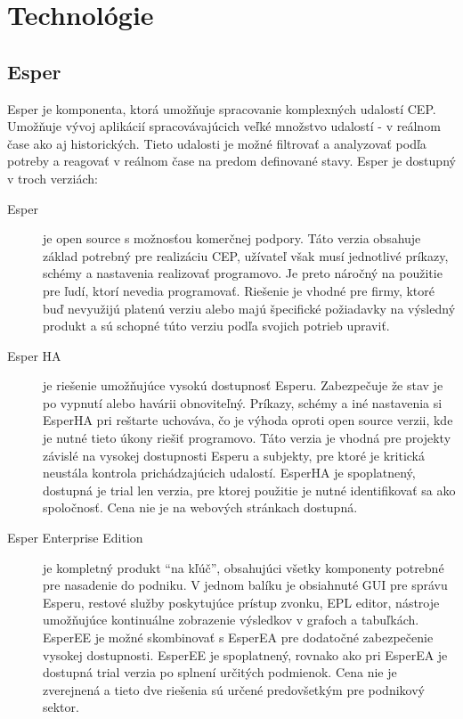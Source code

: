 \chapter{Technológie}
\label{chap:technologie}

\section{Esper}
	Esper je komponenta, ktorá umožňuje spracovanie komplexných udalostí \ac{CEP}. Umožňuje vývoj aplikácií spracovávajúcich veľké množstvo udalostí - v reálnom čase ako aj historických. Tieto udalosti je možné filtrovať a analyzovať podľa potreby a reagovať v reálnom čase na predom definované stavy.  Esper je dostupný v troch verziách:
	\begin{description}
		\item[Esper] je open source s možnosťou komerčnej podpory. Táto verzia obsahuje základ potrebný pre realizáciu CEP, užívateľ však musí jednotlivé príkazy, schémy a nastavenia realizovať programovo. Je preto náročný na použitie pre ľudí, ktorí nevedia programovať. Riešenie je vhodné pre firmy, ktoré buď nevyužijú platenú verziu alebo majú špecifické požiadavky na výsledný produkt a sú schopné túto verziu podľa svojich potrieb upraviť.
		
		\item[Esper HA] je riešenie umožňujúce vysokú dostupnosť Esperu. Zabezpečuje že stav je po vypnutí alebo havárii obnoviteľný. Príkazy, schémy a iné nastavenia si EsperHA pri reštarte uchováva, čo je výhoda oproti open source verzii, kde je nutné tieto úkony riešiť programovo. Táto verzia je vhodná pre projekty závislé na vysokej dostupnosti Esperu a subjekty, pre ktoré je kritická neustála kontrola prichádzajúcich udalostí.
		EsperHA je spoplatnený, dostupná je trial len verzia, pre ktorej použitie je nutné identifikovať sa ako spoločnosť. Cena nie je na webových stránkach dostupná.
		
		\item[Esper Enterprise Edition] je kompletný produkt ``na kľúč'', obsahujúci všetky komponenty potrebné pre nasadenie do podniku. V jednom balíku je obsiahnuté GUI pre správu Esperu, restové služby poskytujúce prístup zvonku, \ac{EPL} editor, nástroje umožňujúce kontinuálne zobrazenie výsledkov v grafoch a tabuľkách. EsperEE je možné skombinovať s EsperEA pre dodatočné zabezpečenie vysokej dostupnosti. EsperEE je spoplatnený, rovnako ako pri EsperEA je dostupná trial verzia po splnení určitých podmienok. Cena nie je zverejnená a tieto dve riešenia sú určené predovšetkým pre podnikový sektor.
	\end{description}
	

